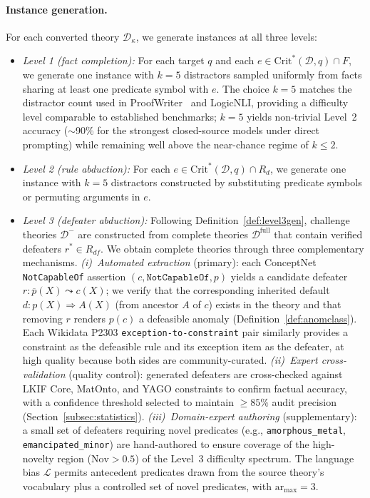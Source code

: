 \documentclass{article}
\theoremstyle{definition}
\newcommand{\D}{\mathcal{D}}
\newcommand{\Dm}{\mathcal{D}^{-}}
\newcommand{\Dfull}{\mathcal{D}^{\mathrm{full}}}
\newcommand{\La}{\mathcal{L}}
\newcommand{\Rd}{R_d}
\newcommand{\Rdf}{R_{df}}
\newcommand{\partfunc}{\kappa}
\newcommand{\CritStar}{\mathrm{Crit}^{*}}
\newcommand{\Nov}{\mathrm{Nov}}
\newcommand{\defto}{\Rightarrow}
\newcommand{\defeatto}{\leadsto}
\newcommand{\comp}[1]{\overline{#1}}
\begin{document}
\paragraph{Instance generation.} For each converted theory $\D_\partfunc$, we generate instances at all three levels:
\begin{itemize}[nosep]
    \item \textit{Level 1 (fact completion):} For each target $q$ and each $e \in \CritStar(\D, q) \cap F$, we generate one instance with $k = 5$ distractors sampled uniformly from facts sharing at least one predicate symbol with $e$. The choice $k = 5$ matches the distractor count used in ProofWriter~\cite{tafjord2021proofwriter} and LogicNLI, providing a difficulty level comparable to established benchmarks; $k = 5$ yields non-trivial Level~2 accuracy ($\sim$90\% for the strongest closed-source models under direct prompting) while remaining well above the near-chance regime of $k \leq 2$.
    \item \textit{Level 2 (rule abduction):} For each $e \in \CritStar(\D, q) \cap \Rd$, we generate one instance with $k = 5$ distractors constructed by substituting predicate symbols or permuting arguments in $e$.
    \item \textit{Level 3 (defeater abduction):} Following Definition~\ref{def:level3gen}, challenge theories $\Dm$ are constructed from complete theories $\Dfull$ that contain verified defeaters $r^* \in \Rdf$. We obtain complete theories through three complementary mechanisms. \emph{(i)~Automated extraction} (primary): each ConceptNet \texttt{NotCapableOf} assertion $(c, \texttt{NotCapableOf}, p)$ yields a candidate defeater $r: \comp{p}(X) \defeatto c(X)$; we verify that the corresponding inherited default $d: p(X) \defto A(X)$ (from ancestor $A$ of $c$) exists in the theory and that removing $r$ renders $p(c)$ a defeasible anomaly (Definition~\ref{def:anomclass}). Each Wikidata P2303 \texttt{exception-to-constraint} pair similarly provides a constraint as the defeasible rule and its exception item as the defeater, at high quality because both sides are community-curated. \emph{(ii)~Expert cross-validation} (quality control): generated defeaters are cross-checked against LKIF Core, MatOnto, and YAGO constraints to confirm factual accuracy, with a confidence threshold selected to maintain $\geq 85\%$ audit precision (Section~\ref{subsec:statistics}). \emph{(iii)~Domain-expert authoring} (supplementary): a small set of defeaters requiring novel predicates (e.g., \texttt{amorphous\_metal}, \texttt{emancipated\_minor}) are hand-authored to ensure coverage of the high-novelty region ($\Nov > 0.5$) of the Level~3 difficulty spectrum. The language bias $\La$ permits antecedent predicates drawn from the source theory's vocabulary plus a controlled set of novel predicates, with $\mathrm{ar}_{\max} = 3$.
\end{itemize}
\end{document}
